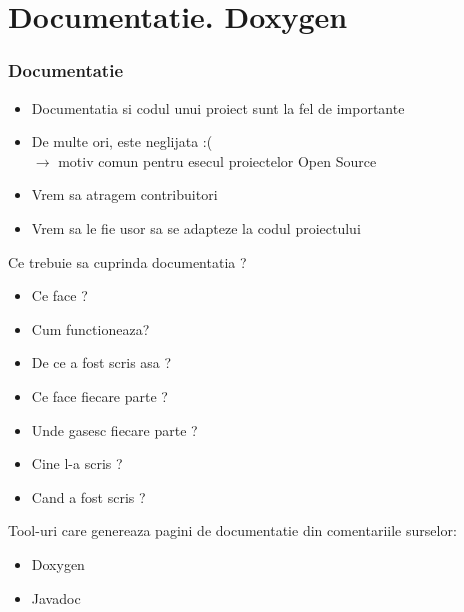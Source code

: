 \documentclass{beamer}
\begin{document}
\section{Documentatie. Doxygen}

  \frame{\tableofcontents[currentsection]}

  \begin{frame}[allowframebreaks]
  \frametitle{Documentatie}
  \begin{itemize}
  \item Documentatia si codul unui proiect sunt la fel de importante
  \item De multe ori, este neglijata :( \\ $\rightarrow$ motiv comun pentru esecul proiectelor Open Source \\ \vspace{1.5cm}
  \item Vrem sa atragem contribuitori
  \item Vrem sa le fie usor sa se adapteze la codul proiectului
  \end{itemize}
  \framebreak
  Ce trebuie sa cuprinda documentatia ?\\
  \begin{itemize}
  \item Ce face ?
  \item Cum functioneaza?
  \item De ce a fost scris asa ?
  \item Ce face fiecare parte ?
  \item Unde gasesc fiecare parte ?
  \item Cine l-a scris ?
  \item Cand a fost scris ?
  \end{itemize}
  \vspace{0.5cm}
  Tool-uri care genereaza pagini de documentatie din comentariile surselor:\\
  \begin{itemize}
  \item Doxygen
  \item Javadoc
  \end{itemize}
  \end{frame}
\end{document}
